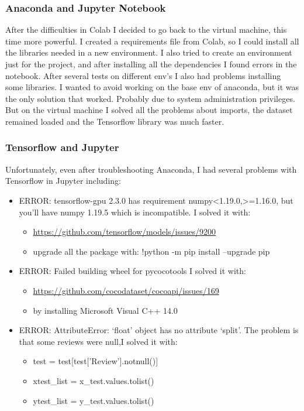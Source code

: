 \subsubsection{Anaconda and Jupyter Notebook}
After the difficulties in Colab I decided to go back to the virtual machine, this time more powerful. I created a requirements file from Colab, so I could install all the libraries needed in a new environment. I also tried to create an environment just for the project, and after installing all the dependencies I found errors in the notebook. After several tests on different env's I also had problems installing some libraries. I wanted to avoid working on the base env of anaconda, but it was the only solution that worked. Probably due to system administration privileges. But on the virtual machine I solved all the problems about imports, the dataset remained loaded and the \gls{Tensorflow} library was much faster.

\subsubsection{Tensorflow and Jupyter}
Unfortunately, even after troubleshooting Anaconda, I had several problems with \gls{Tensorflow} in Jupyter including:
\begin{itemize}
    \item ERROR: tensorflow-gpu 2.3.0 has requirement numpy<1.19.0,>=1.16.0, but you'll have numpy 1.19.5 which is incompatible.
    I solved it with:
        \begin{itemize}
            \item \url{https://github.com/tensorflow/models/issues/9200}
            \item upgrade all the package with: !python -m pip install --upgrade pip
        \end{itemize}
    \item ERROR: Failed building wheel for pycocotools
    I solved it with:
        \begin{itemize}
            \item \url{https://github.com/cocodataset/cocoapi/issues/169}
            \item by installing Microsoft Visual C++ 14.0
        \end{itemize}
    \item ERROR: AttributeError: `float' object has no attribute `split'.
     The problem is that some reviews were null,I solved it with:
        \begin{itemize}
            \item test = test[test['Review'].notnull()]
            \item xtest\_list = x\_test.values.tolist()
            \item ytest\_list = y\_test.values.tolist()
        \end{itemize}
\end{itemize}

